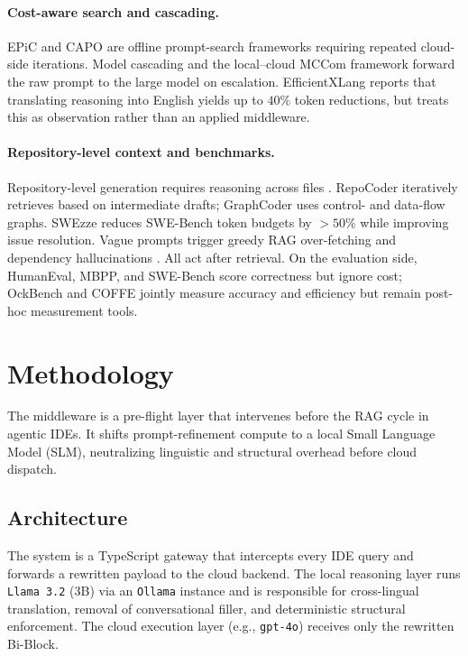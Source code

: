 \documentclass[11pt,a4paper,twocolumn]{article}
\begin{document}
\paragraph{Cost-aware search and cascading.} EPiC \cite{taherkhani2025epic} and CAPO \cite{zehle2025capo} are offline prompt-search frameworks requiring repeated cloud-side iterations. Model cascading \cite{chen2024modelcascading} and the local--cloud MCCom framework \cite{lu2026mccom} forward the raw prompt to the large model on escalation. EfficientXLang \cite{ahuja2025efficientxlang} reports that translating reasoning into English yields up to $40\%$ token reductions, but treats this as observation rather than an applied middleware.

\paragraph{Repository-level context and benchmarks.} Repository-level generation requires reasoning across files \cite{liu2024graphcoder}. RepoCoder \cite{zhang-etal-2023-repocoder} iteratively retrieves based on intermediate drafts; GraphCoder \cite{liu2024graphcoder} uses control- and data-flow graphs. SWEzze \cite{mechtaev2026compressing} reduces SWE-Bench token budgets by $>50\%$ while improving issue resolution. Vague prompts trigger greedy RAG over-fetching and dependency hallucinations \cite{lehai2026repository, blackduck2026ossra, morphllm2026context}. All act after retrieval. On the evaluation side, HumanEval, MBPP, and SWE-Bench \cite{jimenez2024swebench} score correctness but ignore cost; OckBench \cite{du2026ockbench} and COFFE \cite{peng2025coffe} jointly measure accuracy and efficiency but remain post-hoc measurement tools.

\section{Methodology}
\label{sec:methodology}

The middleware is a pre-flight layer that intervenes before the RAG cycle in agentic IDEs. It shifts prompt-refinement compute to a local Small Language Model (SLM), neutralizing linguistic and structural overhead before cloud dispatch.

\subsection{Architecture}
The system is a TypeScript gateway that intercepts every IDE query and forwards a rewritten payload to the cloud backend. The local reasoning layer runs \texttt{Llama 3.2} (3B) \cite{meta2024llama32} via an \texttt{Ollama} instance and is responsible for cross-lingual translation, removal of conversational filler, and deterministic structural enforcement. The cloud execution layer (e.g., \texttt{gpt-4o}) receives only the rewritten Bi-Block.
\end{document}
